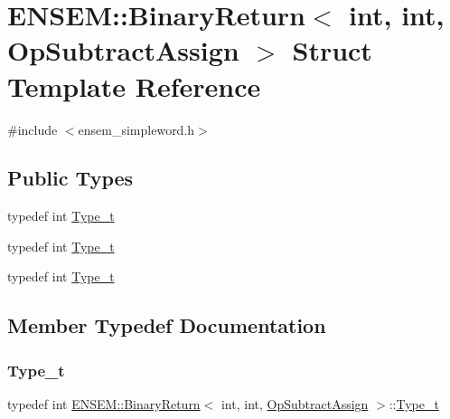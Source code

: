 \hypertarget{structENSEM_1_1BinaryReturn_3_01int_00_01int_00_01OpSubtractAssign_01_4}{}\section{E\+N\+S\+EM\+:\+:Binary\+Return$<$ int, int, Op\+Subtract\+Assign $>$ Struct Template Reference}
\label{structENSEM_1_1BinaryReturn_3_01int_00_01int_00_01OpSubtractAssign_01_4}


{\ttfamily \#include $<$ensem\+\_\+simpleword.\+h$>$}

\subsection*{Public Types}
\begin{DoxyCompactItemize}
\item 
typedef int \mbox{\hyperlink{structENSEM_1_1BinaryReturn_3_01int_00_01int_00_01OpSubtractAssign_01_4_a5c5a1e9edfbb3a04f0197f2657b88279}{Type\+\_\+t}}
\item 
typedef int \mbox{\hyperlink{structENSEM_1_1BinaryReturn_3_01int_00_01int_00_01OpSubtractAssign_01_4_a5c5a1e9edfbb3a04f0197f2657b88279}{Type\+\_\+t}}
\item 
typedef int \mbox{\hyperlink{structENSEM_1_1BinaryReturn_3_01int_00_01int_00_01OpSubtractAssign_01_4_a5c5a1e9edfbb3a04f0197f2657b88279}{Type\+\_\+t}}
\end{DoxyCompactItemize}


\subsection{Member Typedef Documentation}
\mbox{\label{structENSEM_1_1BinaryReturn_3_01int_00_01int_00_01OpSubtractAssign_01_4_a5c5a1e9edfbb3a04f0197f2657b88279}} 
\subsubsection{\texorpdfstring{Type\_t}{Type\_t}\hspace{0.1cm}{\footnotesize\ttfamily [1/3]}}
{\footnotesize\ttfamily typedef int \mbox{\hyperlink{structENSEM_1_1BinaryReturn}{E\+N\+S\+E\+M\+::\+Binary\+Return}}$<$ int, int, \mbox{\hyperlink{structENSEM_1_1OpSubtractAssign}{Op\+Subtract\+Assign}} $>$\+::\mbox{\hyperlink{structENSEM_1_1BinaryReturn_3_01int_00_01int_00_01OpSubtractAssign_01_4_a5c5a1e9edfbb3a04f0197f2657b88279}{Type\+\_\+t}}}

